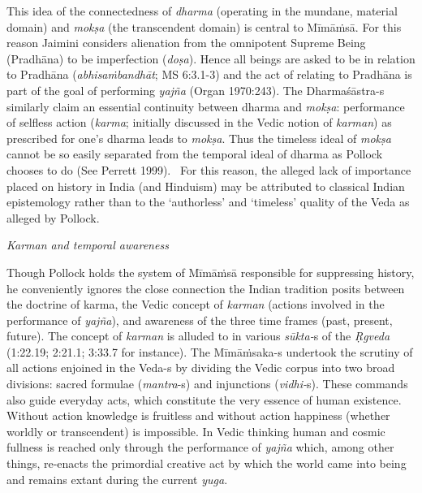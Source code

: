 This idea of the connectedness of \textit{dharma} (operating in the mundane, material domain) and \textit{mokṣa} (the transcendent domain) is central to Mīmāṁsā. For this reason Jaimini considers alienation from the omnipotent Supreme Being (Pradhāna) to be imperfection (\textit{doṣa}). Hence all beings are asked to be in relation to Pradhāna (\textit{abhisaṁbandhāt}; MS 6:3.1-3) and the act of relating to Pradhāna is part of the goal of performing \textit{yajña} (Organ 1970:243). The Dharmaśāstra-s similarly claim an essential continuity between dharma and \textit{mokṣa}: performance of selfless action (\textit{karma}; initially discussed in the Vedic notion of \textit{karman}) as prescribed for one's dharma leads to \textit{mokṣa}. Thus the timeless ideal of \textit{mokṣa} cannot be so easily separated from the temporal ideal of dharma as Pollock chooses to do (See Perrett 1999).  For this reason, the alleged lack of importance placed on history in India (and Hinduism) may be attributed to classical Indian epistemology rather than to the ‘authorless’ and ‘timeless’ quality of the Veda as alleged by Pollock.

\textit{Karman and temporal awareness}

Though Pollock holds the system of Mīmāṁsā responsible for suppressing history, he conveniently ignores the close connection the Indian tradition posits between the doctrine of karma, the Vedic concept of \textit{karman} (actions involved in the performance of \textit{yajña}), and awareness of the three time frames (past, present, future). The concept of \textit{karman} is alluded to in various \textit{sūkta-}s of the \textit{Ṛgveda} (1:22.19; 2:21.1; 3:33.7 for instance). The Mīmāṁsaka-s undertook the scrutiny of all actions enjoined in the Veda-s by dividing the Vedic corpus into two broad divisions: sacred formulae (\textit{mantra}-s) and injunctions (\textit{vidhi-}s). These commands also guide everyday acts, which constitute the very essence of human existence. Without action knowledge is fruitless and without action happiness (whether worldly or transcendent) is impossible. In Vedic thinking human and cosmic fullness is reached only through the performance of \textit{yajña} which, among other things, re-enacts the primordial creative act by which the world came into being and remains extant during the current \textit{yuga}.

